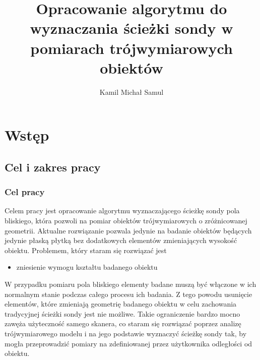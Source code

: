 \documentclass[a4paper,12pt,twoside,openany]{report}
\title{Opracowanie algorytmu do wyznaczania ścieżki sondy w pomiarach trójwymiarowych obiektów}
\author{Kamil Michał Samul}
\begin{document}
\maketitle

\chapter{Wstęp}

  \section{Cel i zakres pracy}
    \subsection{Cel pracy}
      Celem pracy jest opracowanie algorytmu wyznaczającego ścieżkę sondy pola bliskiego, 
      która pozwoli na pomiar obiektów trójwymiarowych o zróżnicowanej geometrii.
      Aktualne rozwiązanie pozwala jedynie na badanie obiektów będących jedynie płaską 
      płytką bez dodatkowych elementów zmieniających wysokość obiektu.
      Problemem, który staram się rozwiązać jest 
      \begin{itemize}
        \item zniesienie wymogu kształtu badanego obiektu
      \end{itemize}
      W przypadku pomiaru pola bliskiego elementy badane muszą być włączone w ich normalnym stanie
      podczas całego procesu ich badania. Z tego powodu usunięcie elementów, które zmieniają geometrię
      badanego obiektu w celu zachowania tradycyjnej ścieżki sondy jest nie możliwe.
      Takie ograniczenie bardzo mocno zawęża użyteczność samego skanera, co staram się rozwiązać poprzez analizę
      trójwymiarowego modelu i na jego podstawie wyznaczyć ścieżkę sondy tak, by mogła przeprowadzić pomiary
      na zdefiniowanej przez użytkownika odległości od obiektu.
\end{document}
